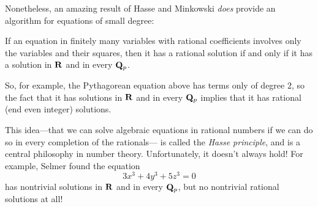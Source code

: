 \documentclass[11pt,oneside]{amsart}
\begin{document}
Nonetheless, an amazing result of Hasse and Minkowski {\em does} provide an algorithm for equations of small degree:

\begin{theorem}
	If an equation in finitely many variables with rational coefficients involves only the variables and their squares, 
	then it has a rational solution if and only if it has a solution in $\mathbf{R}$ and in every $\mathbf{Q}_p$.
\end{theorem}

So, for example, the Pythagorean equation above has terms only of degree $2$, so the fact that it has solutions in $\mathbf{R}$
and in every $\mathbf{Q}_p$ implies that it has rational (end even integer) solutions.

This idea---that we can solve algebraic equations in rational numbers if we can do so in every completion of the rationals---
is called the {\em Hasse principle}, and is a central philosophy in number theory.  Unfortunately, it doesn't always hold!
For example, Selmer found the equation
$$
	3x^3 + 4y^3 + 5z^3 = 0
$$
has nontrivial solutions in $\mathbf{R}$ and in every $\mathbf{Q}_p$, but no nontrivial rational solutions at all!




 









\end{document}
